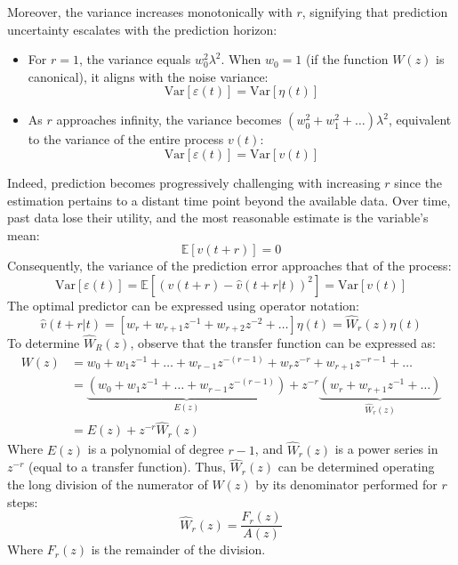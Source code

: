 Moreover, the variance increases monotonically with $r$, signifying that prediction uncertainty escalates with the prediction horizon:
\begin{itemize}
    \item For $r=1$, the variance equals $w_0^2\lambda^2$. 
        When $w_0=1$ (if the function $W(z)$ is canonical), it aligns with the noise variance:
        \[\text{Var}\left[\varepsilon(t) \right]=\text{Var}\left[\eta(t) \right]\]
    \item As $r$ approaches infinity, the variance becomes $(w_0^2 + w_1^2 + \dots)\lambda^2$, equivalent to the variance of the entire process $v(t)$:
        \[\text{Var}\left[\varepsilon(t) \right]=\text{Var}\left[v(t) \right]\]
\end{itemize}
Indeed, prediction becomes progressively challenging with increasing $r$ since the estimation pertains to a distant time point beyond the available data. 
Over time, past data lose their utility, and the most reasonable estimate is the variable's mean: 
\[\mathbb{E}\left[v(t+r)\right]=0\]
Consequently, the variance of the prediction error approaches that of the process:
\[\text{Var}\left[\varepsilon(t)\right]=\mathbb{E}\left[\left(v(t+r)-\hat{v}(t+r|t)\right)^2\right]=\text{Var}\left[v(t)\right]\]
The optimal predictor can be expressed using operator notation:
\[\hat{v}(t+r|t)=\left[w_r+w_{r+1}z^{-1}+w_{r+2}z^{-2}+\dots \right]\eta(t)=\hat{W}_r(z)\eta(t)\]
To determine $\hat{W}_R(z)$, observe that the transfer function can be expressed as:
\begin{align*}
    W(z)    &= w_0+w_1z^{-1} + \dots + w_{r-1}z^{-(r-1)}+w_rz^{-r}+w_{r+1}z^{-r-1}+\dots \\
            &= \underbrace{\left(w_0+w_1z^{-1} + \dots + w_{r-1}z^{-(r-1)}\right)}_{E(z)}  +z^{-r}\underbrace{\left( w_r+w_{r+1}z^{-1}+\dots\right)}_{\hat{W}_r(z)} \\
            &= E(z)  +z^{-r}\hat{W}_r(z)              
\end{align*}
Where $E(z)$ is a polynomial of degree $r-1$, and $\hat{W}_r(z)$ is a power series in $z^{-r}$ (equal to a transfer function). 
Thus, $\hat{W}_r(z)$ can be determined operating the long division of the numerator of $W(z)$ by its denominator performed for $r$ steps: 
\[\hat{W}_r(z)=\dfrac{F_r(z)}{A(z)}\]
Where $F_r(z)$ is the remainder of the division. 
